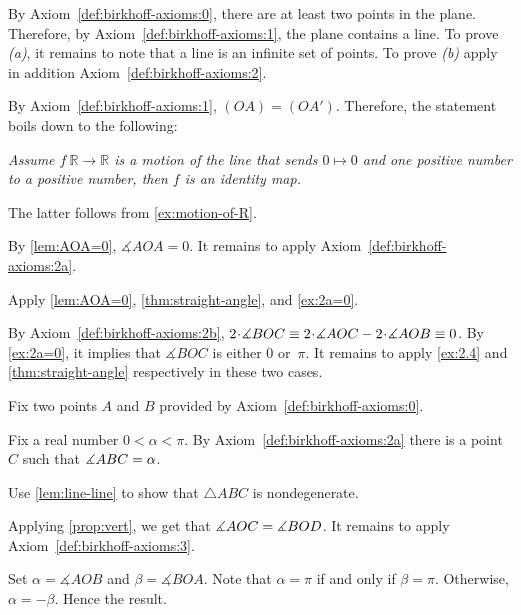 \begin{multicols}{2}
 By Axiom~\ref{def:birkhoff-axioms:0}, there are at least two points in the plane.
Therefore, by Axiom~\ref{def:birkhoff-axioms:1}, 
the plane contains a line. 
To prove \textit{(a)}, it remains to note that a line is an infinite set of points.
To prove \textit{(b)} apply in addition Axiom~\ref{def:birkhoff-axioms:2}.

\parbf{\ref{ex:[OA)=[OA')}.}
By Axiom~\ref{def:birkhoff-axioms:1},
$(OA)=(OA')$.
Therefore, the statement boils down to the following:

\textit{Assume $f\:\mathbb{R}\to \mathbb{R}$ is a motion of the line that sends $0\mapsto 0$ and one positive number to a positive number, then $f$ is an identity map.}

The latter follows from \ref{ex:motion-of-R}.

By \ref{lem:AOA=0},
$\measuredangle AOA=0$.
It remains to apply Axiom~\ref{def:birkhoff-axioms:2a}.

Apply \ref{lem:AOA=0},
\ref{thm:straight-angle},
and \ref{ex:2a=0}.

By Axiom~\ref{def:birkhoff-axioms:2b},
$2\cdot\measuredangle BOC
\equiv 
2\cdot\measuredangle AOC\z-2\cdot \measuredangle AOB
\equiv 0$.
By \ref{ex:2a=0}, 
it implies that 
$\measuredangle BOC$ is either $0$ or~$\pi$.
It remains to apply \ref{ex:2.4} and \ref{thm:straight-angle} respectively in these two cases.

Fix two points $A$ and $B$ provided by Axiom~\ref{def:birkhoff-axioms:0}.

Fix a real number $0<\alpha<\pi$.
By Axiom~\ref{def:birkhoff-axioms:2a} there is a point $C$ such that $\measuredangle ABC\z=\alpha$.

Use \ref{lem:line-line} to show that $\triangle ABC$ is nondegenerate.

Applying \ref{prop:vert}, we get that
$\measuredangle AOC\z= \measuredangle BOD$.
It remains to apply Axiom~\ref{def:birkhoff-axioms:3}.

\setcounter{eqtn}{0}

Set $\alpha=\measuredangle AOB$ 
and 
$\beta=\measuredangle BOA$.
Note that $\alpha=\pi$ if and only if $\beta=\pi$.
Otherwise, $\alpha=-\beta$.
Hence the result.


\end{multicols}
